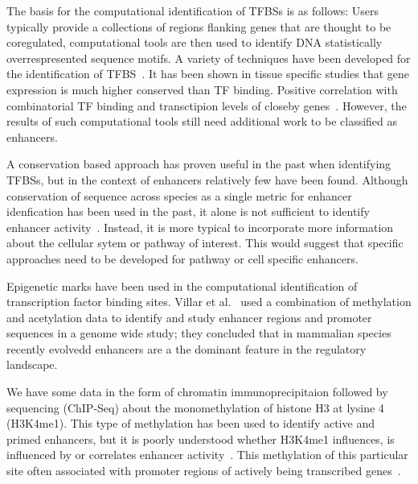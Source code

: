         The basis for the computational identification of TFBSs is as follows: Users typically provide a collections of regions flanking genes that are thought to be coregulated, computational tools are then used to identify DNA statistically overrespresented sequence motifs. A variety of techniques have been developed for the identification of TFBS~\cite{tompa2005assessing}. It has been shown in tissue specific studies that gene expression is much higher conserved than TF binding. Positive correlation with combinatorial TF binding and transctipion levels of closeby genes~\cite{wong2014decoupling}. However, the results of such computational tools still need additional work to be classified as enhancers. 
        
        A conservation based approach has proven useful in the past when identifying TFBSs, but in the context of enhancers relatively few have been found. Although conservation of sequence across species as a single metric for enhancer idenfication has been used in the past, it alone is not sufficient to identify enhancer activity~\cite{blow2010chip}. Instead, it is more typical to incorporate more information about the cellular sytem or pathway of interest. 
        This would suggest that specific approaches need to be developed for pathway or cell specific enhancers. 

        Epigenetic marks have been used in the computational identification of transcription factor binding sites. Villar et al.~\cite{villar2015enhancer} used a combination of methylation and acetylation data to identify and study enhancer regions and promoter sequences in a genome wide study; they concluded that in mammalian species recently evolvedd enhancers are a the dominant feature in the regulatory landscape.

        
        We have some data in the form of chromatin immunoprecipitaion followed by sequencing (ChIP-Seq) about the monomethylation of histone H3 at lysine 4 (H3K4me1). This type of methylation has been used to identify active and primed enhancers, but it is poorly understood whether H3K4me1 influences, is influenced by or correlates enhancer activity~\cite{rada2018h3k4me1}. This methylation of this particular site often associated with promoter regions of actively being transcribed genes~\cite{barski2007high}. 


